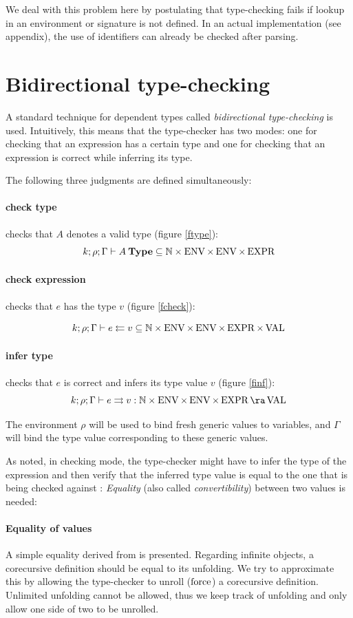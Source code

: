We deal with this problem here by postulating that type-checking fails if lookup in an environment or signature is not defined.
In an actual implementation (see appendix), the use of identifiers can already be checked after parsing. 

\section{Bidirectional type-checking} 
A standard technique for dependent types called \emph{bidirectional type-checking} is used.
Intuitively, this means that the type-checker has two modes:
one for checking that an expression has a certain type and one for checking that an expression is correct while inferring its type.

\noindent The following three judgments are defined simultaneously:
\paragraph*{check type} checks that $A$ denotes a valid type (figure \ref{ftype}): 
\[k;\rho;\Gamma\vdash A\:\mathbf{Type} \subseteq \mathbb{N} \times \operatorname{ENV} \times \operatorname{ENV} \times \operatorname{EXPR} \]

\paragraph*{check expression} checks that $e$ has the type $v$ (figure \ref{fcheck}):

\[k;\rho;\Gamma\vdash e\leftleftarrows v \subseteq \mathbb{N} \times \operatorname{ENV} \times \operatorname{ENV} \times \operatorname{EXPR} \times \operatorname{VAL}\]

\paragraph*{infer type} checks that $e$ is correct and infers its type value $v$ (figure \ref{finf}):
\[\Infer{k}{\rho}{\Gamma}{e}{v} : \cN \times \Env \times \Env \times \Expr \ra \Val\]


The environment $\rho$ will be used to bind fresh generic values to variables, and $\Gamma$ will bind the type value corresponding to these generic values.

As noted, in checking mode, the type-checker might have to infer the type of the expression and then verify that the inferred type value is equal to the one that is being checked against : \emph{Equality} (also called \emph{convertibility}) between two values is needed:

\paragraph*{Equality of values}
A simple equality derived from \cite{coquand96algorithm} is presented. 
Regarding infinite objects, a corecursive definition should be equal to its unfolding.
We try to approximate this by allowing the type-checker to unroll ($\operatorname{force}$) a corecursive definition. Unlimited unfolding cannot be allowed, thus we keep track of unfolding and only allow one side of two to be unrolled.


